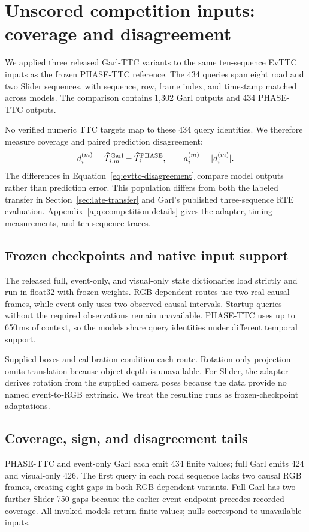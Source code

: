 \section{Unscored competition inputs: coverage and disagreement}
\label{sec:evttc-competition}
We applied three released Garl-TTC variants to the same ten-sequence EvTTC inputs as the frozen PHASE-TTC reference. The 434 queries span eight road and two Slider sequences, with sequence, row, frame index, and timestamp matched across models. The comparison contains 1,302 Garl outputs and 434 PHASE-TTC outputs. 

No verified numeric TTC targets map to these 434 query identities. We therefore measure coverage and paired prediction disagreement:
\begin{equation}
d_i^{(m)}=\widehat T_{i,m}^{\rm Garl}-\widehat T_i^{\rm PHASE},\qquad a_i^{(m)}=|d_i^{(m)}|.
\label{eq:evttc-disagreement}
\end{equation}
The differences in Equation~\ref{eq:evttc-disagreement} compare model outputs rather than prediction error. This population differs from both the labeled transfer in Section~\ref{sec:late-transfer} and Garl's published three-sequence RTE evaluation. Appendix~\ref{app:competition-details} gives the adapter, timing measurements, and ten sequence traces.

\subsection{Frozen checkpoints and native input support}
The released full, event-only, and visual-only state dictionaries load strictly and run in float32 with frozen weights. RGB-dependent routes use two real causal frames, while event-only uses two observed causal intervals. Startup queries without the required observations remain unavailable. PHASE-TTC uses up to 650\,ms of context, so the models share query identities under different temporal support. 

Supplied boxes and calibration condition each route. Rotation-only projection omits translation because object depth is unavailable. For Slider, the adapter derives rotation from the supplied camera poses because the data provide no named event-to-RGB extrinsic. We treat the resulting runs as frozen-checkpoint adaptations.

\subsection{Coverage, sign, and disagreement tails}

PHASE-TTC and event-only Garl each emit 434 finite values; full Garl emits 424 and visual-only 426. The first query in each road sequence lacks two causal RGB frames, creating eight gaps in both RGB-dependent variants. Full Garl has two further Slider-750 gaps because the earlier event endpoint precedes recorded coverage. All invoked models return finite values; nulls correspond to unavailable inputs.

